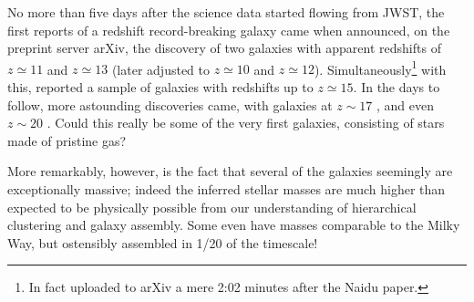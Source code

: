 \documentclass[useAMS]{aa}
\begin{document}
No more than five days after the science data started flowing from JWST, the first reports of a redshift record-breaking galaxy came when \citet{Naidu2022} announced, on the preprint server arXiv, the discovery of two galaxies with apparent redshifts of $z\simeq11$ and $z\simeq13$ (later adjusted to $z\simeq10$ and $z\simeq12$).
Simultaneously\footnote{In fact uploaded to arXiv a mere 2:02 minutes after the Naidu paper.} with this, \citet{Castellano2022} reported a sample of galaxies with redshifts up to $z\simeq15$.
In the days to follow, more astounding discoveries came, with galaxies at
$z\sim17$ \citep{Donnan2023,Harikane2022}, and even
$z\sim20$ \citep{Yan2023}.
Could this really be some of the very first galaxies, consisting of stars made of pristine gas?

More remarkably, however, is the fact that several of the galaxies seemingly are exceptionally massive; indeed the inferred stellar masses are much higher than expected to be physically possible from our understanding of hierarchical clustering and galaxy assembly.
Some even have masses comparable to the Milky Way, but ostensibly assembled in 1/20 of the timescale!
\end{document}
